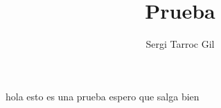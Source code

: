 \documentclass[12pt,a4paper]{report}
\author{Sergi Tarroc Gil}
\title{Prueba}
\begin{document}
\maketitle

\paragraph{}hola esto es una prueba espero que salga bien
\end{document}
